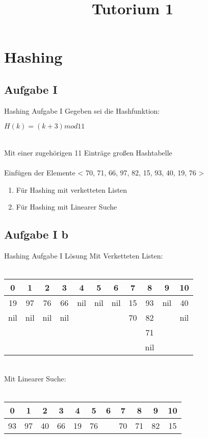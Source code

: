 
\title[Algorithmen I SS 14]{Tutorium 1}


\section{Hashing}
	\subsection{Aufgabe I}
	\begin{frame}{Hashing Aufgabe I}
		Gegeben sei die Hashfunktion: \\
		\begin{center}
			$ H(k) = (k+3) mod 11$ 
		\end{center}
		\ \\
		Mit einer zugehörigen 11 Einträge großen Hashtabelle \\
		\ \\
		Einfügen der Elemente < 70, 71, 66, 97, 82, 15, 93, 40, 19, 76 >
		\\
		\begin{enumerate}
			\item Für Hashing mit verketteten Listen
			\item Für Hashing mit Linearer Suche
		\end{enumerate}

	\end{frame}

	\subsection{Aufgabe I b}	
	\begin{frame}{Hashing Aufgabe I Lösung}
		Mit Verketteten Listen:
		\ \\
		\ \\
		\begin{tabular*}{0.75\textwidth}{  c | c | c | c | c | c | c | c | c | c | c  }
			0 & 1 & 2 & 3 & 4 & 5 & 6 & 7 & 8 & 9 & 10 \\
			\hline
			19 & 97 & 76 & 66 & nil & nil & nil & 15 & 93 & nil & 40 \\
			 nil & nil & nil & nil &  &  &  & 70 & 82 &  & nil \\
			  &  &  &  &  &  &  &  & 71 &  &  \\
 			  &  &  &  &  &  &  &  & nil &  &  \\

			
		\end{tabular*}
		\ \\
		\parskip 16pt
		Mit Linearer Suche:
		\ \\
		\ \\
		\begin{tabular*}{0.75\textwidth}{  c | c | c | c | c | c | c | c | c | c | c  }
			0 & 1 & 2 & 3 & 4 & 5 & 6 & 7 & 8 & 9 & 10 \\
			\hline
			93 & 97 & 40 & 66 & 19 & 76 &  & 70 & 71 & 82 & 15 \\			
		\end{tabular*}

	\end{frame}

